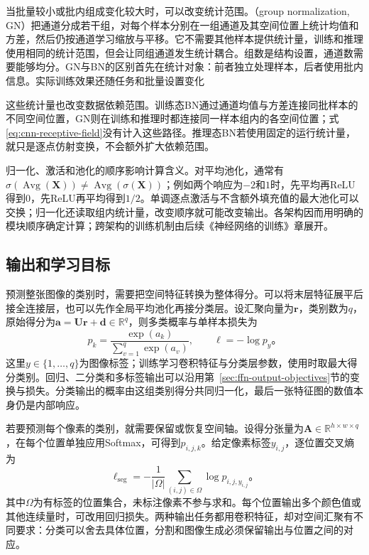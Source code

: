 当批量较小或批内组成变化较大时，可以改变统计范围。（group normalization, GN）把通道分成若干组，对每个样本分别在一组通道及其空间位置上统计均值和方差，然后仍按通道学习缩放与平移。它不需要其他样本提供统计量，训练和推理使用相同的统计范围，但会让同组通道发生统计耦合。组数是结构设置，通道数需要能够均分。GN与BN的区别首先在统计对象：前者独立处理样本，后者使用批内信息。实际训练效果还随任务和批量设置变化

这些统计量也改变数据依赖范围。训练态BN通过通道均值与方差连接同批样本的不同空间位置，GN则在训练和推理时都连接同一样本组内的各空间位置；式\eqref{eq:cnn-receptive-field}没有计入这些路径。推理态BN若使用固定的运行统计量，就只是逐点仿射变换，不会额外扩大依赖范围。

归一化、激活和池化的顺序影响计算含义。对平均池化，通常有$\sigma(\operatorname{Avg}(\bm X))\neq\operatorname{Avg}(\sigma(\bm X))$；例如两个响应为$-2$和$1$时，先平均再ReLU得到$0$，先ReLU再平均得到$1/2$。单调逐点激活与不含额外填充值的最大池化可以交换；归一化还读取组内统计量，改变顺序就可能改变输出。各架构因而用明确的模块顺序确定计算；跨架构的训练机制由后续《神经网络的训练》章展开。

\subsection{输出和学习目标}
\label{sec:cnn-output-objectives}

预测整张图像的类别时，需要把空间特征转换为整体得分。可以将末层特征展平后接全连接层，也可以先作全局平均池化再接分类层。设汇聚向量为$\bm r$，类别数为$q$，原始得分为$\bm a=\bm U\bm r+\bm d\in\mathbb R^q$，则多类概率与单样本损失为
\begin{equation}
  p_k=\frac{\exp(a_k)}{\sum_{v=1}^{q}\exp(a_v)},\qquad
  \ell=-\log p_y\text{。}
  \label{eq:cnn-image-classification}
\end{equation}
这里$y\in\{1,\ldots,q\}$为图像标签；训练学习卷积特征与分类层参数，使用时取最大得分类别。回归、二分类和多标签输出可以沿用第~\ref{sec:ffn-output-objectives}节的变换与损失。分类输出的概率由这组类别得分共同归一化，最后一张特征图的数值本身仍是内部响应。

若要预测每个像素的类别，就需要保留或恢复空间轴。设得分张量为$\bm A\in\mathbb R^{h\times w\times q}$，在每个位置单独应用Softmax，可得到$p_{i,j,k}$。给定像素标签$y_{i,j}$，逐位置交叉熵为
\begin{equation}
  \ell_{\mathrm{seg}}=-\frac1{|\Omega|}
    \sum_{(i,j)\in\Omega}\log p_{i,j,y_{i,j}}\text{。}
  \label{eq:cnn-segmentation-loss}
\end{equation}
其中$\Omega$为有标签的位置集合，未标注像素不参与求和。每个位置输出多个颜色值或其他连续量时，可改用回归损失。两种输出任务都用卷积特征，却对空间汇聚有不同要求：分类可以舍去具体位置，分割和图像生成必须保留输出与位置之间的对应。

